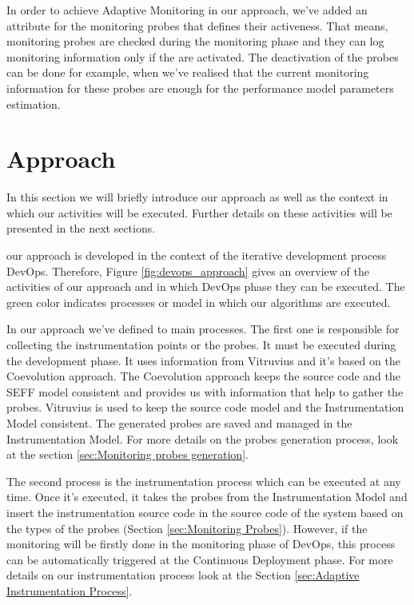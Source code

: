 In order to achieve Adaptive Monitoring in our approach, we've added an attribute for the monitoring probes that defines their activeness. That means, monitoring probes are checked during the monitoring phase and they can log monitoring information only if the are activated. The deactivation of the probes can be done for example, when we've realised that the current monitoring information for these probes are enough for the performance model parameters estimation.



\section{Approach}
\label{sec:approach}
In this section we will briefly introduce our approach as well as the context in which our activities will be executed. Further details on these activities will be presented in the next sections.

our approach is developed in the context of the iterative development process DevOps. Therefore, Figure \ref{fig:devops_approach} gives an overview of the activities of our approach and in which DevOps phase they can be executed. The green color indicates processes or model in which our algorithms are executed. 

In our approach we've defined to main processes. The first one is responsible for collecting the instrumentation points or the probes. It must be executed during the development phase. It uses information from Vitruvius and it's based on the Coevolution approach. The Coevolution approach keeps the source code and the SEFF model consistent and provides us with information that help to gather the probes. Vitruvius is used to keep the source code model and the Instrumentation Model consistent. The generated probes are saved and managed in the Instrumentation Model. For more details on the probes generation process, look at the section \ref{sec:Monitoring probes generation}.

The second process is the instrumentation process which can be executed at any time. Once it's executed, it takes the probes from the Instrumentation Model and insert the instrumentation source code in the source code of the system based on the types of the probes (Section \ref{sec:Monitoring Probes}). However, if the monitoring will be firstly done in the monitoring phase of DevOps, this process can be automatically triggered at the Continuous Deployment phase. For more details on our instrumentation process look at the Section \ref{sec:Adaptive Instrumentation Process}.

